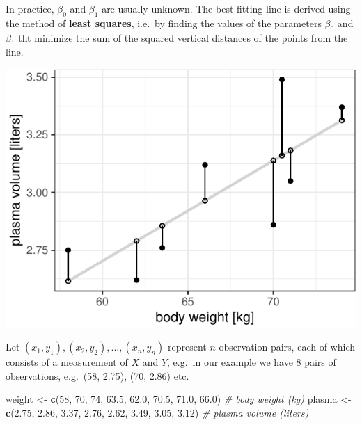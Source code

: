 \documentclass[]{article}
\newenvironment{Shaded}{\begin{snugshade}}{\end{snugshade}}
\newcommand{\CommentTok}[1]{\textcolor[rgb]{0.56,0.35,0.01}{\textit{#1}}}
\newcommand{\DecValTok}[1]{\textcolor[rgb]{0.00,0.00,0.81}{#1}}
\newcommand{\FloatTok}[1]{\textcolor[rgb]{0.00,0.00,0.81}{#1}}
\newcommand{\KeywordTok}[1]{\textcolor[rgb]{0.13,0.29,0.53}{\textbf{#1}}}
\newcommand{\NormalTok}[1]{#1}
\newcommand{\StringTok}[1]{\textcolor[rgb]{0.31,0.60,0.02}{#1}}
\begin{document}
In practice, \(\beta_0\) and \(\beta_1\) are usually unknown. The
best-fitting line is derived using the method of \textbf{least squares},
i.e.~by finding the values of the parameters \(\beta_0\) and \(\beta_1\)
tht minimize the sum of the squared vertical distances of the points
from the line.

\begin{center}\includegraphics{session-regression-I-files/figures/coeff-residuals-1} \end{center}

Let \((x_1, y_1), (x_2, y_2), ..., (x_n, y_n)\) represent \(n\)
observation pairs, each of which consists of a measurement of \(X\) and
\(Y\), e.g.~in our example we have 8 pairs of observations, e.g.~(58,
2.75), (70, 2.86) etc.

\begin{Shaded}
\begin{Highlighting}[]
\NormalTok{weight <-}\StringTok{ }\KeywordTok{c}\NormalTok{(}\DecValTok{58}\NormalTok{, }\DecValTok{70}\NormalTok{, }\DecValTok{74}\NormalTok{, }\FloatTok{63.5}\NormalTok{, }\FloatTok{62.0}\NormalTok{, }\FloatTok{70.5}\NormalTok{, }\FloatTok{71.0}\NormalTok{, }\FloatTok{66.0}\NormalTok{) }\CommentTok{# body weight (kg)}
\NormalTok{plasma <-}\StringTok{ }\KeywordTok{c}\NormalTok{(}\FloatTok{2.75}\NormalTok{, }\FloatTok{2.86}\NormalTok{, }\FloatTok{3.37}\NormalTok{, }\FloatTok{2.76}\NormalTok{, }\FloatTok{2.62}\NormalTok{, }\FloatTok{3.49}\NormalTok{, }\FloatTok{3.05}\NormalTok{, }\FloatTok{3.12}\NormalTok{) }\CommentTok{# plasma volume (liters)}
\end{Highlighting}
\end{Shaded}
\end{document}
